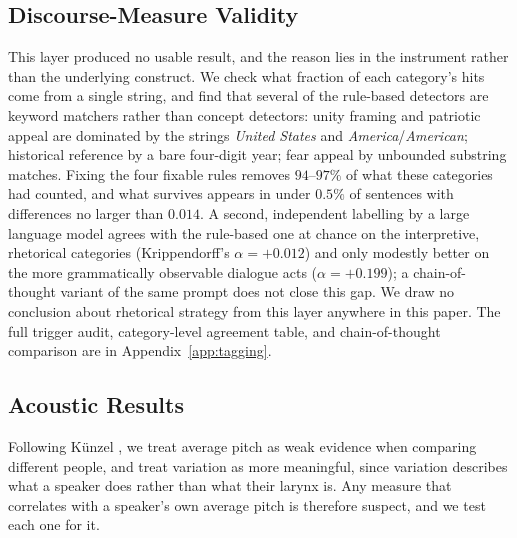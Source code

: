 \documentclass[journal]{IEEEtran}
\begin{document}
\subsection{Discourse-Measure Validity}
\label{sec:method:discourse}

This layer produced no usable result, and the reason lies in the instrument
rather than the underlying construct. We check what fraction of each
category's hits come from a single string, and find that several of the
rule-based detectors are keyword matchers rather than concept detectors:
unity framing and patriotic appeal are dominated by the strings \emph{United
States} and \emph{America}/\emph{American}; historical reference by a bare
four-digit year; fear appeal by unbounded substring matches. Fixing the four
fixable rules removes $94$--$97\%$ of what these categories had counted, and
what survives appears in under $0.5\%$ of sentences with differences no
larger than $0.014$. A second, independent labelling by a large language
model agrees with the rule-based one at chance on the interpretive,
rhetorical categories (Krippendorff's $\alpha = +0.012$) and only modestly
better on the more grammatically observable dialogue acts ($\alpha =
+0.199$); a chain-of-thought variant of the same prompt does not close this
gap. We draw no conclusion about rhetorical strategy from this layer
anywhere in this paper. The full trigger audit, category-level agreement
table, and chain-of-thought comparison are in Appendix~\ref{app:tagging}.

\subsection{Acoustic Results}
\label{sec:method:acoustic}

Following K\"unzel \cite{kunzel1989speakers}, we treat average pitch as weak
evidence when comparing different people, and treat variation as more
meaningful, since variation describes what a speaker does rather than what
their larynx is. Any measure that correlates with a speaker's own average
pitch is therefore suspect, and we test each one for it.
\end{document}
